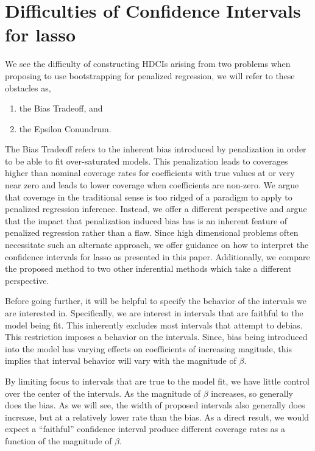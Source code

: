 \section{Difficulties of Confidence Intervals for lasso}\label{Sec:Difficulties}

We see the difficulty of constructing HDCIs arising from two problems when proposing to use bootstrapping for penalized regression, we will refer to these obstacles as,

\begin{enumerate}
\item the Bias Tradeoff, and
\item the Epsilon Conundrum.
\end{enumerate}

The Bias Tradeoff refers to the inherent bias introduced by penalization in order to be able to fit over-saturated models. This penalization leads to coverages higher than nominal coverage rates for coefficients with true values at or very near zero and leads to lower coverage when coefficients are non-zero. We argue that coverage in the traditional sense is too ridged of a paradigm to apply to penalized regression inference. Instead, we offer a different perspective and argue that the impact that penalization induced bias has is an inherent feature of penalized regression rather than a flaw. Since high dimensional problems often necessitate such an alternate approach, we offer guidance on how to interpret the confidence intervals for lasso as presented in this paper. Additionally, we compare the proposed method to two other inferential methods which take a different perspective.

Before going further, it will be helpful to specify the behavior of the intervals we are interested in. Specifically, we are interest in intervals that are faithful to the model being fit. This inherently excludes most intervals that attempt to debias. This restriction imposes a behavior on the intervals. Since, bias being introduced into the model has varying effects on coefficients of increasing magitude, this implies that interval behavior will vary with the magnitude of $\beta$.

By limiting focus to intervals that are true to the model fit, we have little control over the center of the intervals. As the magnitude of $\beta$ increases, so generally does the bias. As we will see, the width of proposed intervals also generally does increase, but at a relatively lower rate than the bias. As a direct result, we would expect a ``faithful'' confidence interval produce different coverage rates as a function of the magnitude of $\beta$.

